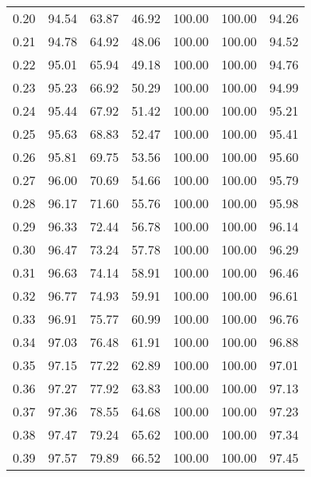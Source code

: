 \begin{tabular}{|c|c|c|c|c|c|c|}
      0.20 &     94.54 &     63.87 &      46.92 &  100.00 &     100.00 &         94.26 \\
      0.21 &     94.78 &     64.92 &      48.06 &  100.00 &     100.00 &         94.52 \\
      0.22 &     95.01 &     65.94 &      49.18 &  100.00 &     100.00 &         94.76 \\
      0.23 &     95.23 &     66.92 &      50.29 &  100.00 &     100.00 &         94.99 \\
      0.24 &     95.44 &     67.92 &      51.42 &  100.00 &     100.00 &         95.21 \\
      0.25 &     95.63 &     68.83 &      52.47 &  100.00 &     100.00 &         95.41 \\
      0.26 &     95.81 &     69.75 &      53.56 &  100.00 &     100.00 &         95.60 \\
      0.27 &     96.00 &     70.69 &      54.66 &  100.00 &     100.00 &         95.79 \\
      0.28 &     96.17 &     71.60 &      55.76 &  100.00 &     100.00 &         95.98 \\
      0.29 &     96.33 &     72.44 &      56.78 &  100.00 &     100.00 &         96.14 \\
      0.30 &     96.47 &     73.24 &      57.78 &  100.00 &     100.00 &         96.29 \\
      0.31 &     96.63 &     74.14 &      58.91 &  100.00 &     100.00 &         96.46 \\
      0.32 &     96.77 &     74.93 &      59.91 &  100.00 &     100.00 &         96.61 \\
      0.33 &     96.91 &     75.77 &      60.99 &  100.00 &     100.00 &         96.76 \\
      0.34 &     97.03 &     76.48 &      61.91 &  100.00 &     100.00 &         96.88 \\
      0.35 &     97.15 &     77.22 &      62.89 &  100.00 &     100.00 &         97.01 \\
      0.36 &     97.27 &     77.92 &      63.83 &  100.00 &     100.00 &         97.13 \\
      0.37 &     97.36 &     78.55 &      64.68 &  100.00 &     100.00 &         97.23 \\
      0.38 &     97.47 &     79.24 &      65.62 &  100.00 &     100.00 &         97.34 \\
      0.39 &     97.57 &     79.89 &      66.52 &  100.00 &     100.00 &         97.45 \\

\end{tabular}

